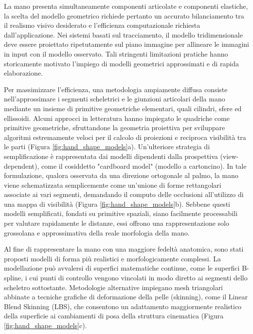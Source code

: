 La mano presenta simultaneamente componenti articolate e componenti elastiche, la scelta del modello geometrico richiede pertanto un accurato bilanciamento tra il realismo visivo desiderato e l'efficienza computazionale richiesta dall'applicazione. 
Nei sistemi basati sul tracciamento, il modello tridimensionale deve essere proiettato ripetutamente sul piano immagine per allineare le immagini in input con il modello osservato.
Tali stringenti limitazioni pratiche hanno storicamente motivato l'impiego di modelli geometrici approssimati e di rapida elaborazione.

Per massimizzare l'efficienza, una metodologia ampiamente diffusa consiste nell'ap\-pros\-si\-ma\-re i segmenti scheletrici e le giunzioni articolari della mano mediante un insieme di primitive geometriche elementari, quali cilindri, sfere ed ellissoidi. 
Alcuni approcci in letteratura hanno impiegato le quadriche come primitive geometriche, sfruttandone la geometria proiettiva per sviluppare algoritmi estremamente veloci per il calcolo di proiezioni e reciproca visibilità tra le parti (Figura \ref{fig:hand_shape_models}a).
Un'ulteriore strategia di semplificazione è rappresentata dai modelli dipendenti dalla prospettiva (view-dependent), come il cosiddetto "cardboard model" (modello a cartoncino).
In tale formulazione, qualora osservata da una direzione ortogonale al palmo, la mano viene schematizzata semplicemente come un'unione di forme rettangolari associate ai vari segmenti, demandando il computo delle occlusioni all'utilizzo di una mappa di visibilità (Figura \ref{fig:hand_shape_models}b). 
Sebbene questi modelli semplificati, fondati su primitive spaziali, siano facilmente processabili per valutare rapidamente le distanze, essi offrono una rappresentazione solo grossolana e approssimativa della reale morfologia della mano.

Al fine di rappresentare la mano con una maggiore fedeltà anatomica, sono stati proposti modelli di forma più realistici e morfologicamente complessi.
La modellazione può avvalersi di superfici matematiche continue, come le superfici B-spline, i cui punti di controllo vengono vincolati in modo diretto ai segmenti dello scheletro sottostante. 
Metodologie alternative impiegano mesh triangolari abbinate a tecniche grafiche di deformazione della pelle (skinning), come il Linear Blend Skinning (LBS), che consentono un adattamento maggiormente realistico della superficie ai cambiamenti di posa della struttura cinematica (Figura \ref{fig:hand_shape_models}c).

